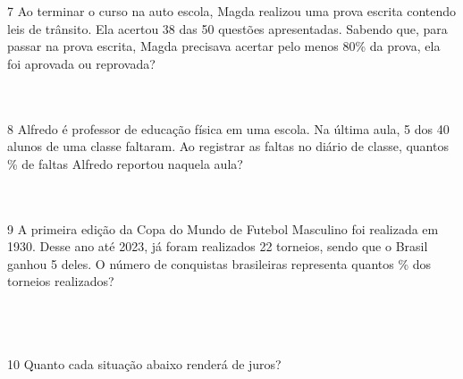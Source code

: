 \num{7} Ao terminar o curso na auto escola, Magda realizou uma prova escrita
contendo leis de trânsito. Ela acertou 38 das 50 questões apresentadas.
Sabendo que, para passar na prova escrita, Magda precisava acertar pelo
menos 80\% da prova, ela foi aprovada ou reprovada?

\\
\\

\num{8} Alfredo é professor de educação física em uma escola. Na última aula,
5 dos 40 alunos de uma classe faltaram. Ao registrar as faltas no diário
de classe, quantos \% de faltas Alfredo reportou naquela aula?

\\
\\

\num{9} A primeira edição da Copa do Mundo de Futebol Masculino foi realizada
em 1930. Desse ano até 2023, já foram realizados 22 torneios, sendo que
o Brasil ganhou 5 deles. O número de conquistas brasileiras representa
quantos \% dos torneios realizados?

\\
\\
\\

\num{10} Quanto cada situação abaixo renderá de juros?

\\

\\
\\
\\
\\
\\

